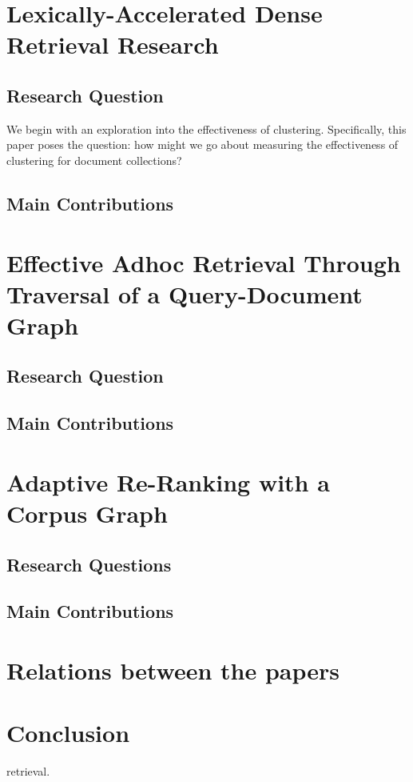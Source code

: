 \documentclass[sigconf,authorversion,nonacm]{acmart}
\begin{document}
\section{Lexically-Accelerated Dense Retrieval Research } 

\subsection{Research
Question}

We begin with an exploration into the effectiveness of clustering. Specifically, this
paper poses the question: how might we go about measuring the effectiveness of clustering for
document collections? 
\subsection{Main Contributions} 


\section{Effective Adhoc Retrieval Through Traversal of a Query-Document Graph}

    \subsection{Research Question} 

    \subsection{Main Contributions} 


\section{Adaptive Re-Ranking with a Corpus Graph}

\subsection{Research Questions} 

\subsection{Main Contributions} 

\section{Relations between the papers}


\section{Conclusion} 

retrieval. \section*{}
 
\end{document}
